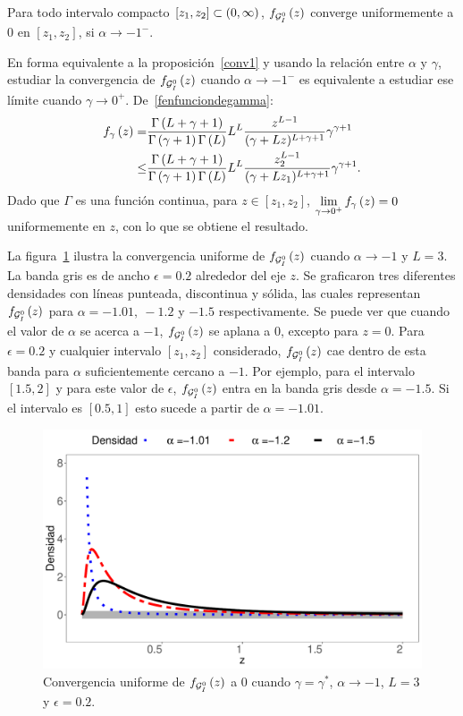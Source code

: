 \begin{proposition}
	\label{conv2}
	Para todo intervalo compacto $[z_{1},z_{2}]\subset\left( 0,\infty \right)$, $f_{\mathcal{G}_I^0}\left( z \right)$ converge
	uniformemente a $0$ en $[z_{1},z_{2}]$, si $\alpha\to -1^{-}$.
\end{proposition}
\begin{dem}
	En forma equivalente a la proposición~\ref{conv1} y usando la relación entre $\alpha$ y $\gamma$, estudiar la convergencia de $f_{\mathcal{G}_I^0}\left( z \right)$ cuando $\alpha\to -1^{-}$ es equivalente a estudiar ese límite cuando ${\gamma\to 0^{+}}$.
	De~\eqref{fenfunciondegamma}:
	\begin{align*}
	f_{\gamma}\left( z \right) = &\frac{\Gamma\left( L+\gamma+1 \right)}{\Gamma\left( \gamma+1 \right)\Gamma\left( L \right)}
	L^{L} \frac{z^{L-1}}{(\gamma+Lz)^{L+\gamma+1}} \gamma^{\gamma +1}  \\
	\leq& \frac{\Gamma\left( L+\gamma+1 \right)}{\Gamma\left( \gamma+1 \right)\Gamma\left( L \right)}
	L^{L} \frac{z_2^{L-1}}{(\gamma+Lz_1)^{L+\gamma+1}} \gamma^{\gamma +1} .
	\end{align*}
	Dado que $\Gamma$ es una función continua, para $z \in [z_{1},z_{2}]$, $\lim\limits_{\gamma\to0^+} f_{\gamma}\left( z \right)=0$ uniformemente en $z$, con lo que se obtiene el resultado.
\end{dem}

La figura~\ref{ConvEnCero} ilustra la convergencia uniforme de $f_{\mathcal{G}_I^0}\left( z \right)$ cuando $\alpha \to -1$ y $L=3$. La banda gris es de ancho $\epsilon=0.2$ alrededor del eje $z$. 
Se graficaron tres diferentes densidades con líneas punteada, discontinua y sólida, las cuales representan $f_{\mathcal{G}_I^0}\left( z \right)$ para $\alpha=-1.01, \ -1.2$ y $-1.5$ respectivamente. 
Se puede ver que cuando el valor de $\alpha$ se acerca a $-1$, $f_{\mathcal{G}_I^0}\left( z \right)$ se aplana a $0$, excepto para $z=0$. 
Para  $\epsilon=0.2$ y cualquier intervalo $[z_1,z_2]$ considerado, $f_{\mathcal{G}_I^0}\left( z \right)$ cae dentro de esta banda para $\alpha$ suficientemente cercano a $-1$. 
Por ejemplo, para el intervalo $[1.5,2]$ y para este valor de $\epsilon$, $f_{\mathcal{G}_I^0}\left( z \right)$ entra en la banda gris desde $\alpha=-1.5$. 
Si el intervalo es $[0.5,1]$ esto sucede a partir de $\alpha=-1.01$.



\begin{figure}[hbt]
	\centering    
	\includegraphics[width=0.8\linewidth]{../../Figures/Tesis/Capitulo4/ConvUnifEnCero.pdf}
	\caption{\label{ConvEnCero}Convergencia uniforme de $f_{\mathcal{G}_I^0}\left( z \right)$ a $0$ cuando $\gamma=\gamma^*$, $\alpha \to -1$, $L=3$ y $\epsilon=0.2$.}
\end{figure}

